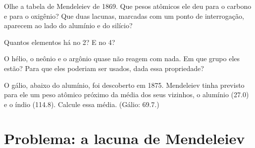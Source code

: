 \begin{exercise}[$\star\star$]\label{exo:g9:periodic-table-first-look:9}
Olhe a tabela de Mendeleiev de 1869. Que pesos atômicos ele deu para o
carbono e para o oxigênio? Que duas lacunas, marcadas com um ponto de
interrogação, aparecem ao lado do alumínio e do silício?
\end{exercise}

\begin{exercise}[$\star\star$]\label{exo:g9:periodic-table-first-look:10}
Quantos elementos há no  2? E no  4?
\end{exercise}

\begin{exercise}[$\star\star\star$]\label{exo:g9:periodic-table-first-look:11}
O hélio, o neônio e o argônio quase não reagem com nada. Em que grupo
eles estão? Para que eles poderiam ser usados, dada essa propriedade?
\end{exercise}

\begin{exercise}[$\star\star\star$]\label{exo:g9:periodic-table-first-look:12}
O gálio, abaixo do alumínio, foi descoberto em 1875. Mendeleiev tinha
previsto para ele um peso atômico próximo da média dos seus vizinhos, o
alumínio (27.0) e o índio (114.8). Calcule essa média. (Gálio: 69.7.)
\end{exercise}

\section{Problema: a lacuna de Mendeleiev}

